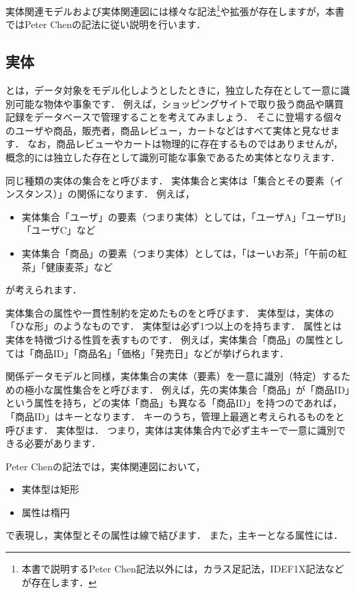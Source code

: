実体関連モデルおよび実体関連図には様々な記法\footnote{本書で説明するPeter Chen記法以外には，カラス足記法，IDEF1X記法などが存在します．}や拡張\cite{Batini1991}が存在しますが，本書ではPeter Chenの記法に従い説明を行います．

\subsection{実体}
とは，データ対象をモデル化しようとしたときに，独立した存在として一意に識別可能な物体や事象です．
例えば，ショッピングサイトで取り扱う商品や購買記録をデータベースで管理することを考えてみましょう．
そこに登場する個々のユーザや商品，販売者，商品レビュー，カートなどはすべて実体と見なせます．
なお，商品レビューやカートは物理的に存在するものではありませんが，概念的には独立した存在として識別可能な事象であるため実体となりえます．

同じ種類の実体の集合をと呼びます．
実体集合と実体は「集合とその要素（インスタンス）」の関係になります．
例えば，
\begin{itemize}
 \item 実体集合「ユーザ」の要素（つまり実体）としては，「ユーザA」「ユーザB」「ユーザC」など
 \item 実体集合「商品」の要素（つまり実体）としては，「はーいお茶」「午前の紅茶」「健康麦茶」など
\end{itemize}
が考えられます．

実体集合の属性や一貫性制約を定めたものをと呼びます．
実体型は，実体の「ひな形」のようなものです．
実体型は必ず1つ以上のを持ちます．
属性とは実体を特徴づける性質を表すものです．
例えば，実体集合「商品」の属性としては「商品ID」「商品名」「価格」「発売日」などが挙げられます．

関係データモデルと同様，実体集合の実体（要素）を一意に識別（特定）するための極小な属性集合をと呼びます．
例えば，先の実体集合「商品」が「商品ID」という属性を持ち，どの実体「商品」も異なる「商品ID」を持つのであれば，「商品ID」はキーとなります．
キーのうち，管理上最適と考えられるものをと呼びます．
実体型は．
つまり，実体は実体集合内で必ず主キーで一意に識別できる必要があります．

Peter Chenの記法では，実体関連図において，
\begin{itemize}
\item 実体型は矩形
\item 属性は楕円
\end{itemize}
で表現し，実体型とその属性は線で結びます．
また，主キーとなる属性には．

